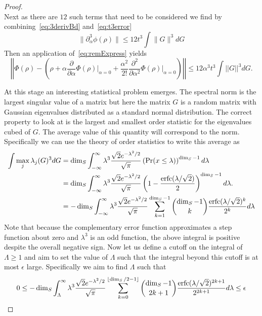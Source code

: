 \documentclass{article}
\newcommand{\norm}[1]{\left| \left| #1 \right| \right|}
\begin{document}
\begin{proof}
\begin{equation}
\end{equation}
Next as there are $12$ such terms that need to be considered we find by combining~\eqref{eq:3derivBd} and~\eqref{eq:t3error}
\begin{equation}
    \|\partial_\alpha^3 \phi(\rho) \| \le 12t^3\int \|G\|^3 dG
\end{equation}
Then an application of~\eqref{eq:remExpress} yields
\begin{equation}
    \norm{\Phi(\rho) - \left(\rho + {\alpha} \frac{\partial}{\partial \alpha} \Phi(\rho) \bigg|_{\alpha = 0} + \frac{\alpha^2}{2!} \frac{\partial^2}{\partial \alpha^2} \Phi(\rho) \bigg|_{\alpha = 0} \right)} \leq 12 \alpha^3 t^3 \int \norm{G}^3 dG.\label{eq:remTaylorBd}
\end{equation}

At this stage an interesting statistical problem emerges.  The spectral norm is the largest singular value of a matrix but here the matrix $G$ is a random matrix with Gaussian eigenvalues distributed as a standard normal distribution.  The correct property to look at is the largest and smallest order statistic for the eigenvalues cubed of $G$.  The average value of this quantity will correspond to the norm.  Specifically we can use the theory of order statistics to write this average as
\begin{align}
    \int \max_j \lambda_j(G)^3 dG &= \dim_S\int_{-\infty}^{\infty}  \lambda^3 \frac{\sqrt{2}e^{-\lambda^2/2}}{\sqrt{\pi}} \left({\rm Pr}(x\le \lambda)\right)^{\dim_S -1} d\lambda\\
    &= \dim_S\int_{-\infty}^{\infty}  \lambda^3 \frac{\sqrt{2}e^{-\lambda^2/2}}{\sqrt{\pi}} \left(1-\frac{{\rm erfc}(\lambda/\sqrt{2})}{2} \right)^{\dim_S-1} d\lambda.\\
    &=-\dim_S\int_{-\infty}^{\infty}  \lambda^3 \frac{\sqrt{2}e^{-\lambda^2/2}}{\sqrt{\pi}} \sum_{k=1}^{\dim_S-1} \binom{\dim_S-1}{k}\frac{{\rm erfc}(\lambda/\sqrt{2})^{k}}{2^{k}} d\lambda
\end{align}
Note that because the complementary error function approximates a step function about zero and $\lambda^3$ is an odd function, the above integral is positive despite the overall negative sign.
Now let us define a cutoff on the integral of $\Lambda\ge 1$ and aim to set the value of $\Lambda$ such that the integral beyond this cutoff is at most $\epsilon$ large.  Specifically we aim to find $\Lambda$ such that
\begin{equation}
    0\le -\dim_S\int_{\Lambda}^{\infty}  \lambda^3 \frac{\sqrt{2}e^{-\lambda^2/2}}{\sqrt{\pi}} \sum_{k=0}^{\lfloor \dim_S/2-1\rfloor} \binom{\dim_S-1}{2k+1}\frac{{\rm erfc}(\lambda/\sqrt{2})^{2k+1}}{2^{2k+1}} d\lambda \le \epsilon

\end{equation}
\end{proof}
\end{document}
